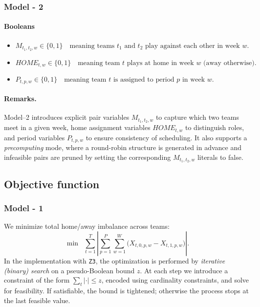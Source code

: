 \documentclass{article}
\begin{document}
\subsubsection{Model - 2}

\paragraph{Booleans}

\begin{itemize}
    \item  $ M_{t_1,t_2,w} \in \{0,1\} \quad\text{meaning teams $t_1$ and $t_2$ play against each other in week $w$}. $
    \item $HOME_{t,w} \in \{0,1\} \quad\text{meaning team $t$ plays at home in week $w$ (away otherwise)}.$
    \item $P_{t,p,w} \in \{0,1\} \quad\text{meaning team $t$ is assigned to period $p$ in week $w$}.$
\end{itemize}


\paragraph{Remarks.}

Model--2 introduces explicit pair variables \(M_{t_1,t_2,w}\) to capture
which two teams meet in a given week, home assignment variables
\(HOME_{t,w}\) to distinguish roles, and period variables
\(P_{t,p,w}\) to ensure consistency of scheduling. It also supports
a \emph{precomputing} mode, where a round-robin structure is generated
in advance and infeasible pairs are pruned by setting the corresponding
\(M_{t_1,t_2,w}\) literals to false.


\subsection{Objective function}

\subsubsection{Model - 1}

We minimize total home/away imbalance across teams:
\[
\min \;\; \sum_{t=1}^{T} \left| 
\sum_{p=1}^{P}\sum_{w=1}^{W} \big( X_{t,0,p,w} - X_{t,1,p,w} \big)
\right|.
\]
In the implementation with \texttt{Z3}, the optimization is performed by 
\emph{iterative (binary) search} on a pseudo-Boolean bound \(z\). 
At each step we introduce a constraint of the form 
\(\sum_t \lvert \cdot \rvert \leq z\), encoded using cardinality 
constraints, and solve for feasibility. If satisfiable, the bound 
is tightened; otherwise the process stops at the last feasible value.
\end{document}
